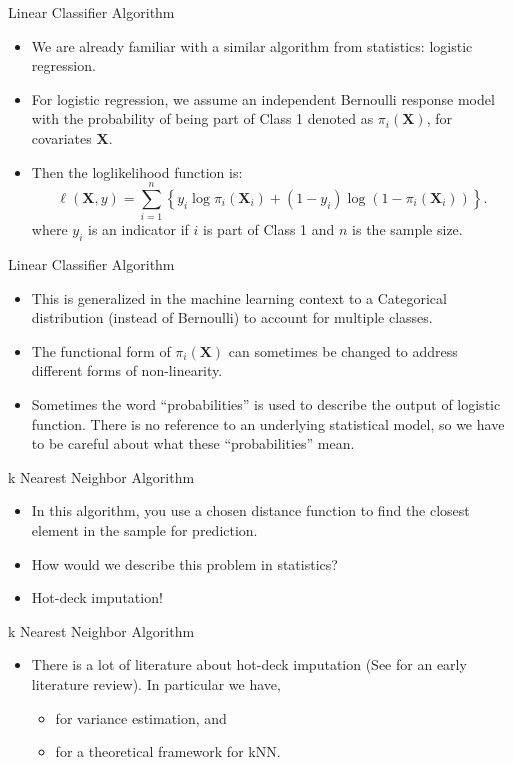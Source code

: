 \documentclass{beamer} %
\renewcommand{\bf}[1]{\mathbf{#1}}
\begin{document}
\begin{frame}{Linear Classifier Algorithm}
  \begin{itemize}
    \item We are already familiar with a similar algorithm from statistics: logistic regression.
    \item For logistic regression, we assume an independent Bernoulli response model with the probability of being part of Class 1 denoted as $\pi_i(\bf{X})$, for covariates $\bf{X}$.
    \item Then the loglikelihood function is:
      $$
      \ell(\bf{X}, y) = \sum_{i = 1}^n \left\{y_i \log \pi_i(\bf{X}_i) + (1 - y_i)\log(1 - \pi_i(\bf{X}_i))\right\}.
      $$
      where $y_i$ is an indicator if $i$ is part of Class 1 and $n$ is the sample size.
  \end{itemize}
\end{frame}

\begin{frame}{Linear Classifier Algorithm}
  \begin{itemize}
    \item This is generalized in the machine learning context to a Categorical distribution (instead of Bernoulli) to account for multiple classes.
    \item The functional form of $\pi_i(\bf{X})$ can sometimes be changed to
      address different forms of non-linearity.
    \item Sometimes the word ``probabilities'' is used to describe the output of logistic function. There is no reference to an underlying statistical model, so we have to be careful about what these ``probabilities'' mean.
  \end{itemize}
\end{frame}

\begin{frame}{k Nearest Neighbor Algorithm}
  \begin{itemize}
    \item In this algorithm, you use a chosen distance function to find the closest element in the sample for prediction.
    \item How would we describe this problem in statistics?
    \item<2-> Hot-deck imputation!
  \end{itemize}
\end{frame}

\begin{frame}{k Nearest Neighbor Algorithm}
  \begin{itemize}
    \item There is a lot of literature about hot-deck imputation (See \cite{andridge2010review} for an early literature review). In particular we have,
      \begin{itemize}
        \item \cite{kim2004fractional} for variance estimation, and
        \item \cite{yang2018integration} for a theoretical framework for kNN.
      \end{itemize}
  \end{itemize}
\end{frame}
\end{document}
